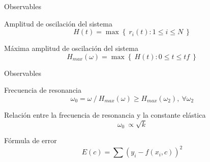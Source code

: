 \begin{frame}{Observables}
    \begin{block}{Amplitud de oscilación del sistema}
        \begin{equation*}
            H(t) = \max \left\{\ r_i(t) : 1 \leq i \leq N\ \right\}
        \end{equation*}
    \end{block}

    \begin{block}{Máxima amplitud de oscilación del sistema}
        \begin{equation*}
            H_{max}(\omega) = \max \left\{\ H(t) : 0 \leq t \leq tf\ \right\}
        \end{equation*}
    \end{block}
\end{frame}

\begin{frame}{Observables}
    \small{
    \begin{block}{Frecuencia de resonancia}
        \begin{equation*}
            \omega_{0} = \omega\ /\ H_{max}(\omega) \geq H_{max}(\omega_2),\ \forall\omega_2
        \end{equation*}
    \end{block}

    \begin{block}{Relación entre la frecuencia de resonancia y la constante elástica}
        \begin{equation*}
            \omega_{0}\ \propto \sqrt{k}
        \end{equation*}
    \end{block}

    \begin{block}{Fórmula de error}
        \begin{equation*}
            E(c) = \sum (y_i - f(x_i, c))^2
        \end{equation*}
    \end{block}
    }
\end{frame}

